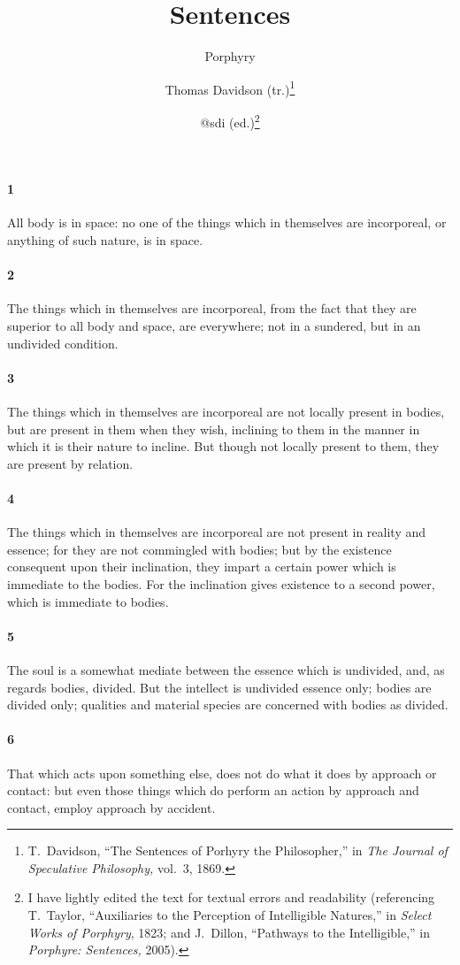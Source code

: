 \documentclass[12pt]{article}
\title{Sentences}
\author{Porphyry \and Thomas Davidson (tr.)\footnote{T.~Davidson, ``The
Sentences of Porhyry the Philosopher,'' in \textit{The Journal of Speculative
Philosophy,} vol.~3, 1869.} \and @sdi (ed.)\footnote{I have lightly edited the
text for textual errors and readability (referencing T.~Taylor, ``Auxiliaries
to the Perception of Intelligible Natures,'' in \textit{Select Works of
Porphyry}, 1823; and J.~Dillon, ``Pathways to the Intelligible,'' in
\textit{Porphyre: Sentences,} 2005).}}
\date{}
\begin{document}
\maketitle

\paragraph{1} All body is in space: no one of the things which in themselves
are incorporeal, or anything of such nature, is in space.

\paragraph{2} The things which in themselves are incorporeal, from the fact
that they are superior to all body and space, are everywhere; not in a
sundered, but in an undivided condition.

\paragraph{3} The things which in themselves are incorporeal are not locally
present in bodies, but are present in them when they wish, inclining to them in
the manner in which it is their nature to incline. But though not locally
present to them, they are present by relation.

\paragraph{4} The things which in themselves are incorporeal are not present in
reality and es\-sence; for they are not commingled with bodies; but by the
existence consequent upon their inclination, they impart a certain power which
is immediate to the bodies. For the inclination gives existence to a second
power, which is immediate to bodies.

\paragraph{5} The soul is a somewhat mediate between the es\-sence which is
undivided, and, as regards bodies, divided. But the intellect is undivided
es\-sence only; bodies are divided only; qualities and material species are
concerned with bodies as divided.

\paragraph{6} That which acts upon something else, does not do what it does by
approach or contact: but even those things which do perform an action by
approach and contact, employ approach by accident.
\end{document}
